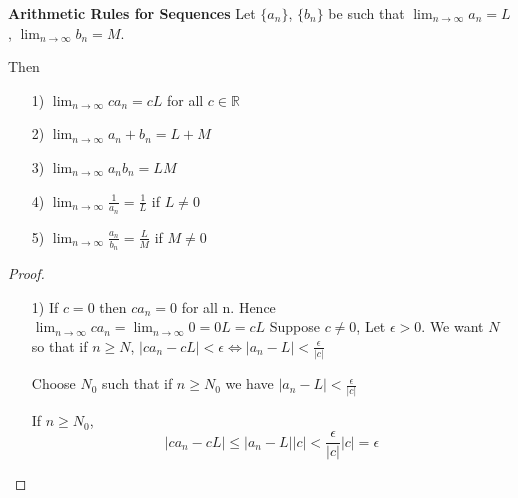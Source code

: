 \begin{thm}
\textbf{Arithmetic Rules for Sequences} Let $\{a_n\}$, $\{b_n\}$ be such that $\lim_{n\to\infty}a_n = L$, $\lim_{n\to\infty}b_n = M$.

Then
\begin{enumerate}
\item[1)] $\lim_{n\to\infty} ca_n = cL$ for all $c\in \mathbb{R}$
\item[2)] $\lim_{n\to\infty} a_n+b_n = L + M$
\item[3)] $\lim_{n\to\infty} a_nb_n = LM$
\item[4)] $\displaystyle\lim_{n\to \infty} \frac{1}{a_n} = \frac{1}{L}$ if $L\neq 0$
\item[5)] $\displaystyle \lim_{n\to\infty} \frac{a_n}{b_n} = \frac{L}{M}$ if $M\neq 0$
\end{enumerate}
\end{thm}

\begin{proof}
\begin{enumerate}
\item[1)] If $c=0$ then $ca_n = 0$ for all n. Hence $\lim_{n\to\infty} ca_n =\lim_{n\to\infty} 0 = 0L = cL$
Suppose $c\neq 0$, Let $\epsilon > 0$. We want $N$ so that if $n\geq N$, $\displaystyle |ca_n - cL| < \epsilon \Leftrightarrow |a_n-L|<\frac{\epsilon}{|c|}$

Choose $N_0$ such that if $n\geq N_0$ we have $\displaystyle |a_n-L|<\frac{\epsilon}{|c|}$

If $n\geq N_0$, $$|ca_n - cL|\leq |a_n - L||c|<\frac{\epsilon}{|c|}|c|=\epsilon$$

\end{enumerate}
\end{proof}




